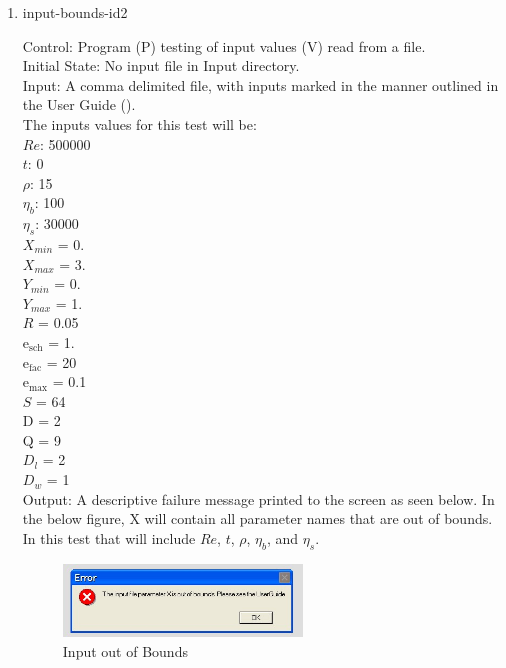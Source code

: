 \documentclass[12pt, titlepage]{article}
\begin{document}
\begin{enumerate}			
					
\item{input-bounds-id2\\}

Control: Program (P) testing of input values (V) read from a file.\\
					
Initial State: No input file in Input directory.\\
					
Input: A comma delimited file, with inputs marked in the manner outlined in the User Guide (\citet{LBM_UserGuide_PM}).\\The inputs values for this test will be:\\$Re$: 500000\\
$t$: 0\\
$\rho$: 15\\
$\eta_b$: 100\\
$\eta_s$: 30000\\
$X_{min}$ = 0.\\
$X_{max}$ = 3.\\
$Y_{min}$ = 0.\\
$Y_{max}$ = 1.\\
$R$ = 0.05\\
$\mathrm{e_{sch}}$ = 1.\\
$\mathrm{e_{fac}}$ = 20\\
$\mathrm{e_{max}}$ = 0.1\\
$S$ = 64\\
$\mathrm{D}$ = 2\\
$\mathrm{Q}$ = 9\\
$D_{l}$ = 2\\
$D_{w}$ = 1\\

					
Output: A descriptive failure message printed to the screen as seen below. In the below figure, X will contain all parameter names that are out of bounds. In this test that will include $Re$, $t$, $\rho$, $\eta_b$, and $\eta_s$.

\begin{figure}[h!]
\begin{center}
\includegraphics[width=0.6\textwidth]{errorMessage.jpeg}
\caption{Input out of Bounds}
\label{Fig_InputError}
\end{center}
\end{figure}


\end{enumerate}
\end{document}
